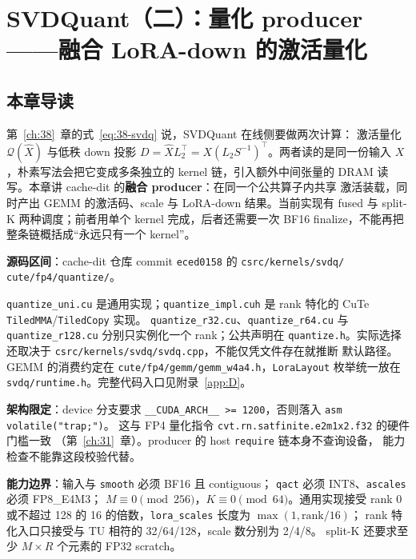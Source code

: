 \chapter{SVDQuant（二）：量化 producer——融合 LoRA-down 的激活量化}\label{ch:39}

\section{本章导读}

第~\ref{ch:38}~章的式~\ref{eq:38-svdq} 说，SVDQuant 在线侧要做两次计算：
激活量化 $\mathcal Q(\widehat X)$ 与低秩 down 投影
$D=\widehat XL_2^{\top}=X(L_2S^{-1})^{\top}$。两者读的是同一份输入
$X$，朴素写法会把它变成多条独立的 kernel 链，引入额外中间张量的 DRAM
读写。本章讲 cache-dit 的\textbf{融合 producer}：在同一个公共算子内共享
激活装载，同时产出 GEMM 的激活码、scale 与 LoRA-down 结果。当前实现有
fused 与 split-K 两种调度；前者用单个 kernel 完成，后者还需要一次 BF16
finalize，不能再把整条链概括成“永远只有一个 kernel”。

\textbf{源码区间}：cache-dit 仓库 commit \texttt{eced0158} 的
\texttt{csrc/}\allowbreak\texttt{kernels/}\allowbreak\texttt{svdq/}%
\allowbreak\texttt{cute/}\allowbreak\texttt{fp4/}\allowbreak\texttt{quantize/}。

\texttt{quantize\_uni.cu} 是通用实现；\texttt{quantize\_impl.cuh} 是 rank
特化的 CuTe \texttt{TiledMMA}/\allowbreak\texttt{TiledCopy} 实现。
\texttt{quantize\_r32.cu}、\texttt{quantize\_r64.cu} 与
\texttt{quantize\_r128.cu} 分别只实例化一个 rank；公共声明在
\texttt{quantize.h}。实际选择还取决于
\texttt{csrc/kernels/svdq/}\allowbreak\texttt{svdq.cpp}，不能仅凭文件存在就推断
默认路径。GEMM 的消费约定在
\texttt{cute/fp4/gemm/}\allowbreak\texttt{gemm\_w4a4.h}，\texttt{LoraLayout}
枚举统一放在 \texttt{svdq/runtime.h}。完整代码入口见附录~\ref{app:D}。

\textbf{架构限定}：device 分支要求
\texttt{\_\_CUDA\_ARCH\_\_ >= 1200}，否则落入 \texttt{asm volatile("trap;")}。
这与 FP4 量化指令 \texttt{cvt.rn.satfinite.e2m1x2.f32} 的硬件门槛一致
（第~\ref{ch:31}~章）。producer 的 host \texttt{require} 链本身不查询设备，
能力检查不能靠这段校验代替。

\textbf{能力边界}：输入与 \texttt{smooth} 必须 BF16 且 contiguous；
\texttt{qact} 必须 INT8、\texttt{ascales} 必须 FP8\_E4M3；
$M\equiv0\pmod{256}$，$K\equiv0\pmod{64}$。通用实现接受 rank 0 或不超过
128 的 16 的倍数，\texttt{lora\_scales} 长度为 $\max(1,\mathrm{rank}/16)$；
rank 特化入口只接受与 TU 相符的 32/64/128，scale 数分别为 2/4/8。
split-K 还要求至少 $M\times R$ 个元素的 FP32 scratch。

